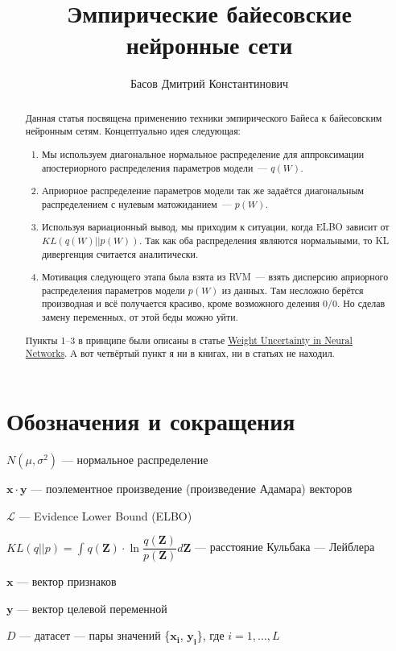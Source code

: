 \documentclass{article}
\title{Эмпирические байесовские нейронные сети}
\author{Басов Дмитрий Константинович}
\date{}
\begin{document}
\maketitle

\begin{abstract}
Данная статья посвящена применению техники эмпирического Байеса к байесовским нейронным сетям. Концептуально идея следующая:
\begin{enumerate}
 \item Мы используем диагональное нормальное распределение для аппроксимации апостериорного распределения параметров модели~--- $q(W)$.
 \item Априорное распределение параметров модели так же задаётся диагональным распределением с нулевым матожиданием~--- $p(W)$.
 \item Используя вариационный вывод, мы приходим к ситуации, когда ELBO зависит от $KL(q(W) || p(W))$. Так как оба распределения являются нормальными, то KL дивергенция считается аналитически.
 \item Мотивация следующего этапа была взята из RVM~--- взять дисперсию априорного распределения параметров модели $p(W)$ из данных. Там несложно берётся производная и всё получается красиво, кроме возможного деления 0/0. Но сделав замену переменных, от этой беды можно уйти.
\end{enumerate}
Пункты 1--3 в принципе были описаны в статье \href{https://arxiv.org/pdf/1505.05424}{Weight Uncertainty in Neural Networks}. А вот четвёртый пункт я ни в книгах, ни в статьях не находил.

\end{abstract}


\section{Обозначения и сокращения}
$N(\mu, \sigma^2)$ — нормальное распределение

$\mathbf{x} \cdot \mathbf{y}$ — поэлементное произведение (произведение Адамара) векторов

$\mathcal{L}$ — Evidence Lower Bound (ELBO)

$KL(q || p) = \int_{}{} q(\mathbf{Z}) \cdot \ln{\dfrac{q(\mathbf{Z})}{p(\mathbf{Z})}} d\mathbf{Z}$ — расстояние Кульбака — Лейблера

$\mathbf{x}$ — вектор признаков

$\mathbf{y}$ — вектор целевой переменной

$D$ — датасет — пары значений \{$\mathbf{x_i}$, $\mathbf{y_i}$\}, где $i = 1, \dots, L$
\end{document}
